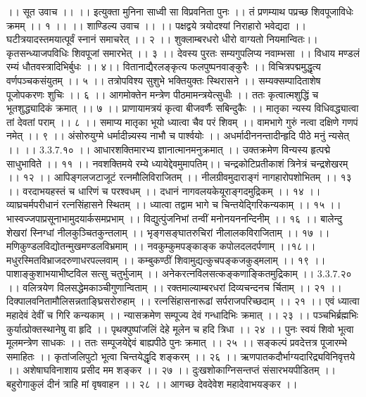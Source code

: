 ।। सूत उवाच ।। ।।
इत्युक्ता मुनिना साध्वी सा विप्रवनिता पुनः ।।
तं प्रणम्याथ पप्रच्छ शिवपूजाविधेः क्रमम् ।। १ ।।
।। शाण्डिल्य उवाच ।। ।।
पक्षद्वये त्रयोदश्यां निराहारो भवेद्यदा ।।
घटीत्रयादस्तमयात्पूर्वं स्नानं समाचरेत् ।। २ ।।
शुक्लाम्बरधरो धीरो वाग्यतो नियमान्वितः।।
कृतसन्ध्याजपविधिः शिवपूजां समारभेत् ।। ३ ।।
देवस्य पुरतः सम्यगुपलिप्य नवाम्भसा ।।
विधाय मण्डलं रम्यं धौतवस्त्रादिभिर्बुधः ।। ४।।
वितानाद्यैरलङ्कृत्य फलपुष्पनवाङ्कुरैः ।।
विचित्रपद्ममुद्धृत्य वर्णपञ्चकसंयुतम् ।। ५ ।।
तत्रोपविश्य सुशुभे भक्तियुक्तः स्थिरासने ।।
सम्यक्सम्पादिताशेष पूजोपकरणः शुचिः ।। ६ ।।
आगमोक्तेन मन्त्रेण पीठमामन्त्रयेत्सुधीः ।।
ततः कृत्वात्मशुद्धिं च भूतशुद्ध्यादिकं क्रमात् ।। ७ ।।
प्राणायामत्रयं कृत्वा बीजवर्णैः सबिन्दुकैः ।।
मातृका न्यस्य विधिवद्ध्यात्वा तां देवतां पराम् ।। ८ ।।
समाप्य मातृका भूयो ध्यात्वा चैव परं शिवम् ।।
वामभागे गुरुं नत्वा दक्षिणे गणपं नमेत् ।। ९ ।।
अंसोरुयुग्मे धर्मादीन्न्यस्य नाभौ च पार्श्वयोः ।।
अधर्मादीननन्तादीन्हृदि पीठे मनुं न्यसेत् ।। ।। 3.3.7.१० ।।
आधारशक्तिमारभ्य ज्ञानात्मानमनुक्रमात् ।।
उक्तक्रमेण विन्यस्य हृत्पद्मे साधुभाविते ।। ११ ।।
नवशक्तिमये रम्ये ध्यायेद्देवमुमापतिम्।।
चन्द्रकोटिप्रतीकाशं त्रिनेत्रं चन्द्रशेखरम् ।। १२ ।।
आपिङ्गलजटाजूटं रत्नमौलिविराजितम् ।।
नीलग्रीवमुदाराङ्गं नागहारोपशोभितम् ।। १३ ।।
वरदाभयहस्तं च धारिणं च परश्वधम् ।।
दधानं नागवलयकेयूराङ्गदमुद्रिकम् ।। १४ ।।
व्याघ्रचर्मपरीधानं रत्नसिंहासने स्थितम् ।।
ध्यात्वा तद्वाम भागे च चिन्तयेद्गिरिकन्यकाम् ।। १५ ।।
भास्वज्जपाप्रसूनाभामुदयार्कसमप्रभाम् ।।
विद्युत्पुंजनिभां तन्वीं मनोनयननन्दिनीम् ।। १६ ।।
बालेन्दु शेखरां स्निग्धां नीलकुञ्चितकुन्तलाम् ।।
भृङ्गसङ्घातरुचिरां नीलालकविराजिताम् ।। १७ ।।
मणिकुण्डलविद्योतन्मुखमण्डलविभ्रमाम् ।।
नवकुम्कुमपङ्काङ्क कपोलदलदर्पणाम् ।।१८।।
मधुरस्मितविभ्राजदरुणाधरपल्लवाम् ।।
कम्बुकण्ठीं शिवामुद्यत्कुचपङ्कजकुड्मलाम् ।। १९ ।।
पाशाङ्कुशाभयाभीष्टविल सत्सु चतुर्भुजाम् ।।
अनेकरत्नविलसत्कङ्कणाङ्कितमुद्रिकाम् ।। 3.3.7.२० ।।
वलित्रयेण विलसद्धेमकाञ्चीगुणान्विताम् ।।
रक्तमाल्याम्बरधरां दिव्यचन्दनच र्चिताम् ।। २१ ।।
दिक्पालवनितामौलिसन्नताङ्घ्रिसरोरुहाम् ।।
रत्नसिंहासनारूढां सर्पराजपरिच्छदाम् ।। २१ ।।
एवं ध्यात्वा महादेवं देवीं च गिरि कन्यकाम् ।।
न्यासक्रमेण सम्पूज्य देवं गन्धादिभिः क्रमात् ।। २३ ।।
पञ्चभिर्ब्रह्मभिः कुर्यात्प्रोक्तस्थानेषु वा हृदि ।।
पृथक्पुष्पांजलिं देहे मूलेन च हदि त्रिधा ।। २४ ।।
पुनः स्वयं शिवो भूत्वा मूलमन्त्रेण साधकः ।।
ततः सम्पूजयेद्देवं बाह्यपीठे पुनः क्रमात् ।। २५ ।।
सङ्कल्पं प्रवदेत्तत्र पूजारम्भे समाहितः ।।
कृतांजलिपुटो भूत्वा चिन्तयेद्धृदि शङ्करम् ।। २६ ।।
ऋणपातकदौर्भाग्यदारिद्र्यविनिवृत्तये ।।
अशेषाघविनाशाय प्रसीद मम शङ्कर ।। २७ ।।
दुःखशोकाग्निसन्तप्तं संसारभयपीडितम् ।।
बहुरोगाकुलं दीनं त्राहि मां वृषवाहन ।। २८ ।।
आगच्छ देवदेवेश महादेवाभयङ्कर ।।
